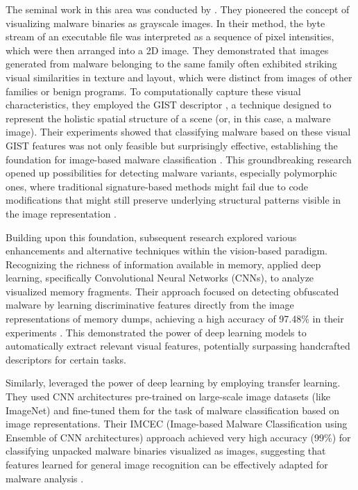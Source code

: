The seminal work in this area was conducted by \citet{nataraj2011malware}. They pioneered the concept of visualizing malware binaries as grayscale images. In their method, the byte stream of an executable file was interpreted as a sequence of pixel intensities, which were then arranged into a 2D image. They demonstrated that images generated from malware belonging to the same family often exhibited striking visual similarities in texture and layout, which were distinct from images of other families or benign programs. To computationally capture these visual characteristics, they employed the GIST descriptor \citep{oliva2001modeling}, a technique designed to represent the holistic spatial structure of a scene (or, in this case, a malware image). Their experiments showed that classifying malware based on these visual GIST features was not only feasible but surprisingly effective, establishing the foundation for image-based malware classification \citep{nataraj2011malware}. This groundbreaking research opened up possibilities for detecting malware variants, especially polymorphic ones, where traditional signature-based methods might fail due to code modifications that might still preserve underlying structural patterns visible in the image representation \citep{gibert2020rise}.

Building upon this foundation, subsequent research explored various enhancements and alternative techniques within the vision-based paradigm. Recognizing the richness of information available in memory, \citet{zhang2023malware} applied deep learning, specifically Convolutional Neural Networks (CNNs), to analyze visualized memory fragments. Their approach focused on detecting obfuscated malware by learning discriminative features directly from the image representations of memory dumps, achieving a high accuracy of 97.48\% in their experiments \citep{zhang2023malware}. This demonstrated the power of deep learning models to automatically extract relevant visual features, potentially surpassing handcrafted descriptors for certain tasks.

Similarly, \citet{vasan2020image} leveraged the power of deep learning by employing transfer learning. They used CNN architectures pre-trained on large-scale image datasets (like ImageNet) and fine-tuned them for the task of malware classification based on image representations. Their IMCEC (Image-based Malware Classification using Ensemble of CNN architectures) approach achieved very high accuracy (99\%) for classifying unpacked malware binaries visualized as images, suggesting that features learned for general image recognition can be effectively adapted for malware analysis \citep{vasan2020image}.

